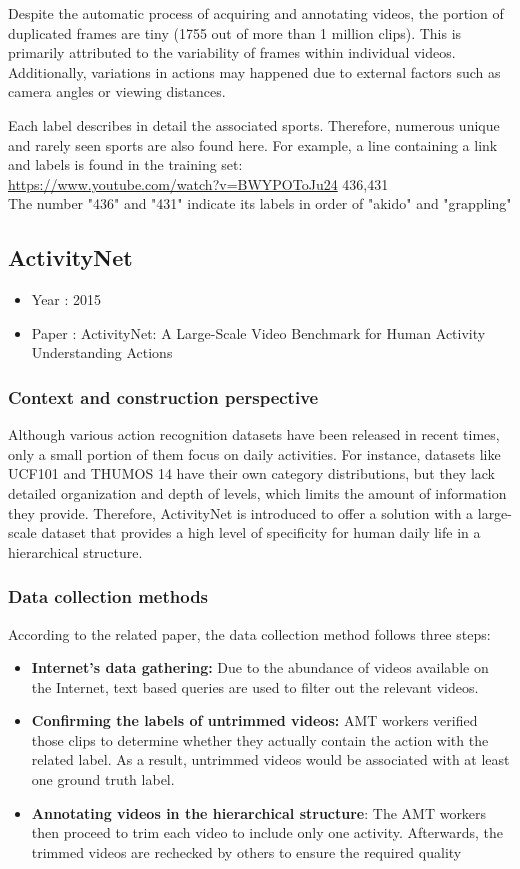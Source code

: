 \documentclass[10pt,onecolumn,letterpaper]{article}
\begin{document}
Despite the automatic process of acquiring and annotating videos, the portion of duplicated frames are tiny (1755 out of more than 1 million clips). This is primarily attributed to the variability of frames within individual videos. Additionally, variations in actions may happened due to external factors such as camera angles or viewing distances.

Each label describes in detail the associated sports. Therefore, numerous unique and rarely seen sports are also found here.
For example, a line containing a link and labels is found in the training set: \\
\url{https://www.youtube.com/watch?v=BWYPOToJu24} 436,431 \\
The number "436" and "431" indicate its labels in order of "akido" and "grappling"

\subsection{ActivityNet}

\begin{itemize}
	\item Year : 2015
	\item Paper : ActivityNet: A Large-Scale Video Benchmark for Human Activity Understanding
	Actions \cite{ActivityNet}
\end{itemize}
\subsubsection{Context and construction perspective}
Although various action recognition datasets have been released in recent times, only a small portion of them focus on daily activities. For instance, datasets like UCF101 \cite{UCF101} and THUMOS 14 \cite{THUMOS} have their own category distributions, but they lack detailed organization and depth of levels, which limits the amount of information they provide. Therefore, ActivityNet is introduced to offer a solution with a large-scale dataset that provides a high level of specificity for human daily life in a hierarchical structure.
\subsubsection{Data collection methods}
According to the related paper, the data collection method follows three steps:
\begin{itemize}
	\item \textbf{Internet's data gathering:} Due to the abundance of videos available on the Internet, text based queries are used to filter out the relevant videos.
	\item \textbf{Confirming the labels of untrimmed videos:} AMT workers verified those clips to determine whether they actually contain the action with the related label. As a result, untrimmed videos would be associated with at least one ground truth label.
	\item \textbf{Annotating videos in the hierarchical structure}: The AMT workers then proceed to trim each video to include only one activity. Afterwards, the trimmed videos are rechecked by others to ensure the required quality
\end{itemize}
\end{document}
